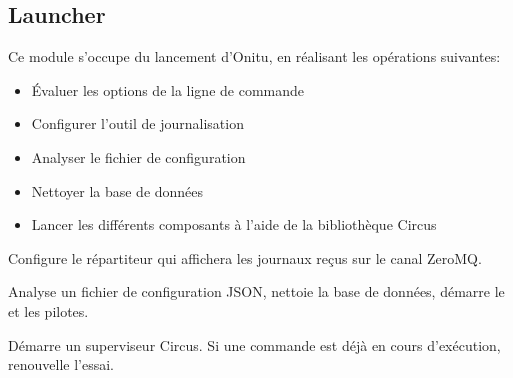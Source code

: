 \documentclass[letterpaper,10pt,english]{sphinxmanual}
\begin{document}
\subsection{Launcher}
\label{components:launcher}\label{components:module-onitu.__main__}
Ce module s'occupe du lancement d'Onitu, en réalisant les opérations suivantes:
\begin{itemize}
\item {} 
Évaluer les options de la ligne de commande

\item {} 
Configurer l'outil de journalisation

\item {} 
Analyser le fichier de configuration

\item {} 
Nettoyer la base de données

\item {} 
Lancer les différents composants à l'aide de la bibliothèque Circus

\end{itemize}

\begin{fulllineitems}
\label{components:onitu.__main__.get_logs_dispatcher}
Configure le répartiteur qui affichera les journaux reçus sur le canal ZeroMQ.

\end{fulllineitems}


\begin{fulllineitems}
\label{components:onitu.__main__.start_setup}
Analyse un fichier de configuration JSON, nettoie la base de données, démarre le {\hyperref[components:onitu.referee.Referee]{}} et les pilotes.

\end{fulllineitems}


\begin{fulllineitems}
\label{components:onitu.__main__.start_watcher}
Démarre un superviseur Circus. Si une commande est déjà en cours d'exécution, renouvelle l'essai.

\end{fulllineitems}
\end{document}
